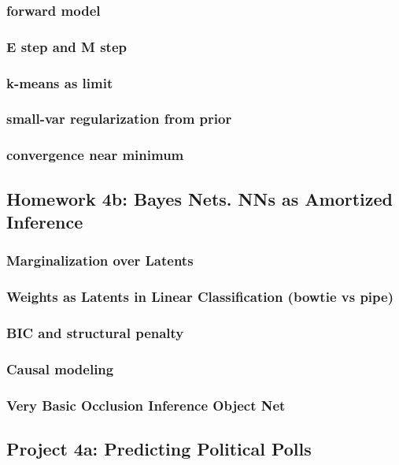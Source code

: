 \documentclass[12pt]{article}
\begin{document}
      \subsubsection*{forward model}
      \subsubsection*{E step and M step}
      \subsubsection*{k-means as limit}
      \subsubsection*{small-var regularization from prior}
      \subsubsection*{convergence near minimum}
    \newpage

    \subsection*{Homework 4b: Bayes Nets.  NNs as Amortized Inference}
      \subsubsection*{Marginalization over Latents}
      \subsubsection*{Weights as Latents in Linear Classification (bowtie vs pipe)}
      \subsubsection*{BIC and structural penalty}
      \subsubsection*{Causal modeling}
      \subsubsection*{Very Basic Occlusion Inference Object Net}
    \newpage

    \subsection*{Project 4a: Predicting Political Polls}
\end{document}
